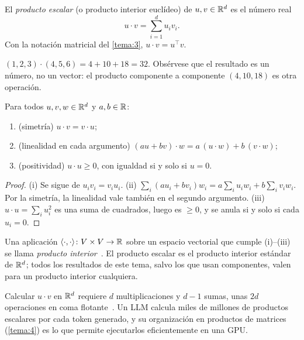\begin{definicion}\label{def:escalar}
El \emph{producto escalar} (o producto interior euclídeo) de $u,v\in\mathbb{R}^{d}$ es el número real
\[
u\cdot v=\sum_{i=1}^{d}u_iv_i.
\]
Con la notación matricial del \cref{tema:3}, $u\cdot v=u^{\top}v$.
\end{definicion}

\begin{ejemplo}
$(1,2,3)\cdot(4,5,6)=4+10+18=32$. Obsérvese que el resultado es un número, no un vector: el producto componente a componente $(4,10,18)$ es otra operación.
\end{ejemplo}

\begin{proposicion}\label{prop:escalar}
Para todos $u,v,w\in\mathbb{R}^{d}$ y $a,b\in\mathbb{R}$:
\begin{enumerate}
  \item (simetría) $u\cdot v=v\cdot u$;
  \item (linealidad en cada argumento) $(au+bv)\cdot w=a\,(u\cdot w)+b\,(v\cdot w)$;
  \item (positividad) $u\cdot u\ge 0$, con igualdad si y solo si $u=0$.
\end{enumerate}
\end{proposicion}

\begin{proof}
(i) Se sigue de $u_iv_i=v_iu_i$. (ii) $\sum_i(au_i+bv_i)w_i=a\sum_iu_iw_i+b\sum_iv_iw_i$. Por la simetría, la linealidad vale también en el segundo argumento. (iii) $u\cdot u=\sum_iu_i^{2}$ es una suma de cuadrados, luego es $\ge 0$, y se anula si y solo si cada $u_i=0$.
\end{proof}

Una aplicación $\langle \cdot,\cdot\rangle\colon V\times V\to\mathbb{R}$ sobre un espacio vectorial que cumple (i)--(iii) se llama \emph{producto interior}~\cite[§3.2]{mml}. El producto escalar es el producto interior estándar de $\mathbb{R}^{d}$; todos los resultados de este tema, salvo los que usan componentes, valen para un producto interior cualquiera.

\begin{observacion}[Coste]
Calcular $u\cdot v$ en $\mathbb{R}^{d}$ requiere $d$ multiplicaciones y $d-1$ sumas, unas $2d$ operaciones en coma flotante~\cite[§1.5]{vmls}. Un LLM calcula miles de millones de productos escalares por cada token generado, y su organización en productos de matrices (\cref{tema:4}) es lo que permite ejecutarlos eficientemente en una GPU.
\end{observacion}

